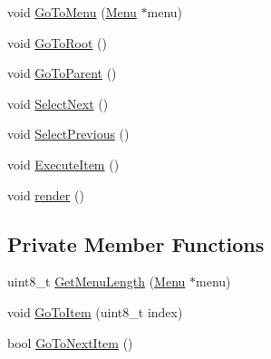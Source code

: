\begin{DoxyCompactItemize}
\item 
void \hyperlink{class_menu_1_1_controller_a1df8e49520c77372d479903c3ec93341}{Go\+To\+Menu} (\hyperlink{struct_menu_1_1_menu}{Menu} $\ast$menu)
\item 
void \hyperlink{class_menu_1_1_controller_a787911ef46ca1968c2fd667af1f9ac27}{Go\+To\+Root} ()
\item 
void \hyperlink{class_menu_1_1_controller_ab30a038c4e4e3cb102d419c11a6813f6}{Go\+To\+Parent} ()
\item 
void \hyperlink{class_menu_1_1_controller_a9aabc6ba652c29efa7a02e12f51ce0b1}{Select\+Next} ()
\item 
void \hyperlink{class_menu_1_1_controller_a04e3448cfe4341ad7209a9f16bbcb449}{Select\+Previous} ()
\item 
void \hyperlink{class_menu_1_1_controller_a0dda40652b8802a8fe39c1ce61a66f1a}{Execute\+Item} ()
\item 
void \hyperlink{class_menu_1_1_controller_ac35f61a344381d3420cae49e2fec829d}{render} ()
\end{DoxyCompactItemize}
\subsection*{Private Member Functions}
\begin{DoxyCompactItemize}
\item 
uint8\+\_\+t \hyperlink{class_menu_1_1_controller_a24009cee76b147079041b2130a806027}{Get\+Menu\+Length} (\hyperlink{struct_menu_1_1_menu}{Menu} $\ast$menu)
\item 
void \hyperlink{class_menu_1_1_controller_afa4a1e26efe90dd5d9479bb8c84404b6}{Go\+To\+Item} (uint8\+\_\+t index)
\item 
bool \hyperlink{class_menu_1_1_controller_ad93989bb6a9ed55f67ad5c15e666cf39}{Go\+To\+Next\+Item} ()
\end{DoxyCompactItemize}
